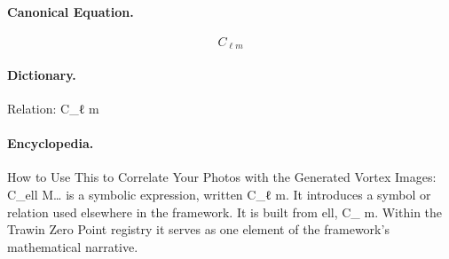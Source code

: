 \paragraph{Canonical Equation.}
\[
C_{\ell m}
\]

\paragraph{Dictionary.}
Relation: C\_ℓ m

\paragraph{Encyclopedia.}
How to Use This to Correlate Your Photos with the Generated Vortex Images: C\_ell M… is a symbolic expression, written C\_ℓ m. It introduces a symbol or relation used elsewhere in the framework. It is built from ell, C\_ m. Within the Trawin Zero Point registry it serves as one element of the framework's mathematical narrative.
